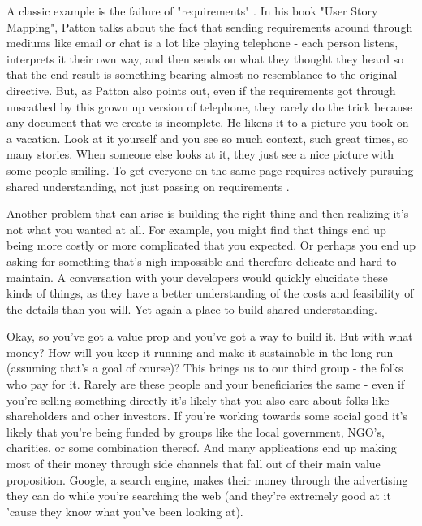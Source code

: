 \documentclass[11pt]{book}
\begin{document}
A classic example is the failure of "requirements" \cite{patton}. In his book "User Story Mapping", Patton talks about the fact that sending requirements around through mediums like email or chat is a lot like playing telephone - each person listens, interprets it their own way, and then sends on what they thought they heard so that the end result is something bearing almost no resemblance to the original directive. But, as Patton also points out, even if the requirements got through unscathed by this grown up version of telephone, they rarely do the trick because any document that we create is incomplete. He likens it to a picture you took on a vacation. Look at it yourself and you see so much context, such great times, so many stories. When someone else looks at it, they just see a nice picture with some people smiling. To get everyone on the same page requires actively pursuing shared understanding, not just passing on requirements \cite{patton}.
\newline

Another problem that can arise is building the right thing and then realizing it's not what you wanted at all. For example, you might find that things end up being more costly or more complicated that you expected. Or perhaps you end up asking for something that's nigh impossible and therefore delicate and hard to maintain. A conversation with your developers would quickly elucidate these kinds of things, as they have a better understanding of the costs and feasibility of the details than you will. Yet again a place to build shared understanding.
\newline

Okay, so you've got a value prop and you've got a way to build it. But with what money? How will you keep it running and make it sustainable in the long run (assuming that's a goal of course)? This brings us to our third group - the folks who pay for it. Rarely are these people and your beneficiaries the same - even if you're selling something directly it's likely that you also care about folks like shareholders and other investors. If you're working towards some social good it's likely that you're being funded by groups like the local government, NGO's, charities, or some combination thereof. And many applications end up making most of their money through side channels that fall out of their main value proposition. Google, a search engine, makes their money through the advertising they can do while you're searching the web (and they're extremely good at it 'cause they know what you've been looking at). 
\newline
\end{document}

